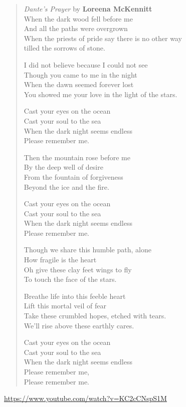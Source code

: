 \begin{verse}
\textit{Dante's Prayer} by \textbf{Loreena McKennitt}\\
When the dark wood fell before me\\
And all the paths were overgrown\\
When the priests of pride say there is no other way\\
tilled the sorrows of stone.

I did not believe because I could not see\\
Though you came to me in the night\\
When the dawn seemed forever lost\\
You showed me your love in the light of the stars.

Cast your eyes on the ocean\\
Cast your soul to the sea\\
When the dark night seems endless\\
Please remember me.

Then the mountain rose before me\\
By the deep well of desire\\
From the fountain of forgiveness\\
Beyond the ice and the fire.

Cast your eyes on the ocean\\
Cast your soul to the sea\\
When the dark night seems endless\\
Please remember me.

Though we share this humble path, alone\\
How fragile is the heart\\
Oh give these clay feet wings to fly\\
To touch the face of the stars.

Breathe life into this feeble heart\\
Lift this mortal veil of fear\\
Take these crumbled hopes, etched with tears.\\
We'll rise above these earthly cares.

Cast your eyes on the ocean\\
Cast your soul to the sea\\
When the dark night seems endless\\
Please remember me,\\
Please remember me.
\end{verse}

\url{https://www.youtube.com/watch?v=KC2cCNspS1M}
